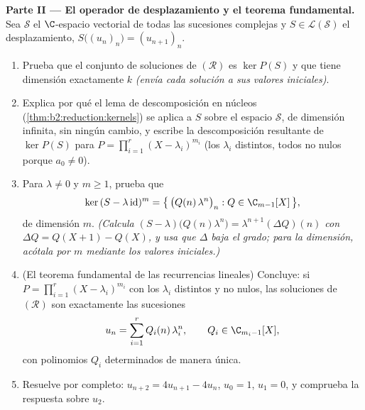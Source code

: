 \begin{problem}
\medskip
\noindent\textbf{Parte II --- El operador de desplazamiento y el
teorema fundamental.} Sea $\mathcal{S}$ el $\C$-espacio vectorial de
todas las sucesiones complejas y $S \in \mathcal{L}(\mathcal{S})$ el
desplazamiento, $S\bigl((u_n)_n\bigr) = (u_{n+1})_n$.
\begin{enumerate}[resume]
  \item Prueba que el conjunto de soluciones de $(\mathcal R)$ es
        $\ker P(S)$ y que tiene dimensión exactamente $k$
        \emph{(envía cada solución a sus valores iniciales)}.
  \item Explica por qué el lema de descomposición en núcleos
        (\cref{thm:b2:reduction:kernels}) se aplica a $S$ sobre el
        espacio $\mathcal{S}$, de dimensión infinita, sin ningún
        cambio, y escribe la descomposición resultante de $\ker
        P(S)$ para $P = \prod_{i=1}^{r}(X - \lambda_i)^{m_i}$ (los
        $\lambda_i$ distintos, todos no nulos porque $a_0 \neq 0$).
  \item Para $\lambda \neq 0$ y $m \geq 1$, prueba que
        \[
        \ker\,(S - \lambda\,\mathrm{id})^m
        = \bigl\{\,\bigl(Q(n)\,\lambda^n\bigr)_n : Q \in
        \C_{m-1}[X]\,\bigr\},
        \]
        de dimensión $m$. \emph{(Calcula $(S -
        \lambda)\bigl(Q(n)\lambda^n\bigr) =
        \lambda^{n+1}(\Delta Q)(n)$ con $\Delta Q = Q(X + 1) -
        Q(X)$, y usa que $\Delta$ baja el grado; para la dimensión,
        acótala por $m$ mediante los valores iniciales.)}
  \item (El teorema fundamental de las recurrencias lineales)
        Concluye: si $P = \prod_{i=1}^{r}(X - \lambda_i)^{m_i}$ con
        los $\lambda_i$ distintos y no nulos, las soluciones de
        $(\mathcal R)$ son exactamente las sucesiones
        \[
        u_n = \sum_{i=1}^{r} Q_i(n)\,\lambda_i^n,
        \qquad Q_i \in \C_{m_i - 1}[X],
        \]
        con polinomios $Q_i$ determinados de manera única.
  \item Resuelve por completo: $u_{n+2} = 4u_{n+1} - 4u_n$, $u_0 =
        1$, $u_1 = 0$, y comprueba la respuesta sobre $u_2$.
\end{enumerate}


\end{problem}
